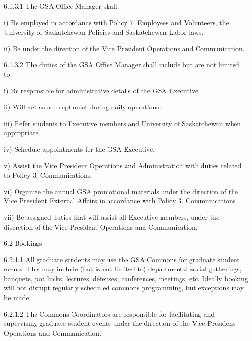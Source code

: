  
 
 6.1.3.1 The GSA Office Manager shall: 
 
 
 
 i) Be employed in accordance with Policy 7. Employees and 
 Volunteers, the University of Saskatchewan Policies and 
 Saskatchewan Labor laws. 
 
 
 
 ii) Be under the direction of the Vice President Operations and 
 Communication. 
 
 
 
 6.1.3.2 The duties of the GSA Office Manager shall include but are not 
 limited to: 
 
 i) Be responsible for administrative details of the GSA Executive. 
 
 
 
 ii) Will act as a receptionist during daily operations. 
 
 
 
 iii) Refer students to Executive members and University of 
 Saskatchewan when appropriate. 
 
 
 
 iv) Schedule appointments for the GSA Executive. 
 
 
 
 v) Assist the Vice President Operations and Administration with 
 duties related to Policy 3. Communications. 
 
 vi) Organize the annual GSA promotional materials under the 
 direction of the Vice President External Affairs in accordance 
 with Policy 3. Communications 
 
 
 
 vii) Be assigned duties that will assist all Executive members, under 
 the discretion of the Vice President Operations and 
 Communication. 
 
 6.2 Bookings 
 
 
 
 6.2.1.1 All graduate students may use the GSA Commons for graduate 
 student events. This may include (but is not limited to) departmental 
 social gatherings, banquets, pot lucks, lectures, defenses, 
 conferences, meetings, etc. Ideally booking will not disrupt 
 regularly scheduled commons programming, but exceptions may be 
 made. 
 
 6.2.1.2 The Commons Coordinators are responsible for facilitating and 
 supervising graduate student events under the direction of the Vice 
 President Operations and Communication. 
 
